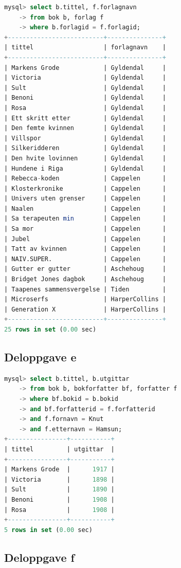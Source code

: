 \documentclass[a4paper, 12pt] {article}
\begin{document}
\begin{lstlisting}[language=SQL, label=oppg3d, caption=Oppgave 3d]
mysql> select b.tittel, f.forlagnavn 
    -> from bok b, forlag f
    -> where b.forlagid = f.forlagid;
+--------------------------+---------------+
| tittel                   | forlagnavn    |
+--------------------------+---------------+
| Markens Grode            | Gyldendal     |
| Victoria                 | Gyldendal     |
| Sult                     | Gyldendal     |
| Benoni                   | Gyldendal     |
| Rosa                     | Gyldendal     |
| Ett skritt etter         | Gyldendal     |
| Den femte kvinnen        | Gyldendal     |
| Villspor                 | Gyldendal     |
| Silkeridderen            | Gyldendal     |
| Den hvite lovinnen       | Gyldendal     |
| Hundene i Riga           | Gyldendal     |
| Rebecca-koden            | Cappelen      |
| Klosterkronike           | Cappelen      |
| Univers uten grenser     | Cappelen      |
| Naalen                   | Cappelen      |
| Sa terapeuten min        | Cappelen      |
| Sa mor                   | Cappelen      |
| Jubel                    | Cappelen      |
| Tatt av kvinnen          | Cappelen      |
| NAIV.SUPER.              | Cappelen      |
| Gutter er gutter         | Aschehoug     |
| Bridget Jones dagbok     | Aschehoug     |
| Taapenes sammensvergelse | Tiden         |
| Microserfs               | HarperCollins |
| Generation X             | HarperCollins |
+--------------------------+---------------+
25 rows in set (0.00 sec)
\end{lstlisting}

\subsection{Deloppgave e}

\begin{lstlisting}[language=SQL, label=oppg3e, caption=Oppgave 3e]
mysql> select b.tittel, b.utgittar
    -> from bok b, bokforfatter bf, forfatter f
    -> where bf.bokid = b.bokid
    -> and bf.forfatterid = f.forfatterid
    -> and f.fornavn = Knut
    -> and f.etternavn = Hamsun;
+----------------+-----------+
| tittel         | utgittar  |
+----------------+-----------+
| Markens Grode  |      1917 |
| Victoria       |      1898 |
| Sult           |      1890 |
| Benoni         |      1908 |
| Rosa           |      1908 |
+----------------+-----------+
5 rows in set (0.00 sec)
\end{lstlisting}

\subsection{Deloppgave f}
\end{document}
